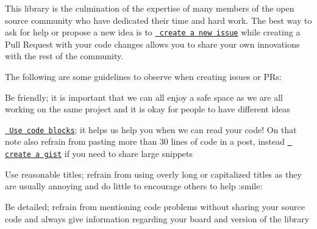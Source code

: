 This library is the culmination of the expertise of many members of the open source community who have dedicated their time and hard work. The best way to ask for help or propose a new idea is to \href{https://github.com/adafruit/DHT-sensor-library/issues/new}{\texttt{ create a new issue}} while creating a Pull Request with your code changes allows you to share your own innovations with the rest of the community.

The following are some guidelines to observe when creating issues or PRs\+:


\begin{DoxyItemize}
\item Be friendly; it is important that we can all enjoy a safe space as we are all working on the same project and it is okay for people to have different ideas
\item \href{https://github.com/adam-p/markdown-here/wiki/Markdown-Cheatsheet\#code}{\texttt{ Use code blocks}}; it helps us help you when we can read your code! On that note also refrain from pasting more than 30 lines of code in a post, instead \href{https://gist.github.com/}{\texttt{ create a gist}} if you need to share large snippets
\item Use reasonable titles; refrain from using overly long or capitalized titles as they are usually annoying and do little to encourage others to help \+:smile\+:
\item Be detailed; refrain from mentioning code problems without sharing your source code and always give information regarding your board and version of the library 
\end{DoxyItemize}